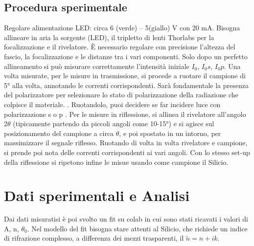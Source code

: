 \documentclass[a4paper,12pt]{article}
\begin{document}
 \subsection{Procedura sperimentale}
 Regolare alimentazione LED:  circa 6 (verde) – 5(giallo) V con 20 mA.
  Bisogna allineare in aria la sorgente (LED), il tripletto di lenti Thorlabs per la focalizzazione e il rivelatore.
   È necessario regolare con precisione l'altezza del fascio, la focalizzazione e le distanze tra i vari componenti.
   Solo dopo un perfetto allineamento si può misurare correttamente l'intensità iniziale $I_0$, $I_0s$, $I_0p$.
   Una volta misurate, per le misure in trasmissione, si procede a ruotare il campione di 5° alla volta, annotando le correnti corrispondenti.
   Sarà fondamentale la presenza del polarizzatore  per selezionare lo stato di polarizzazione della radiazione che colpisce il materiale.
. Ruotandolo, puoi decidere se far incidere luce con polarizzazione s o p .
   Per le misure in riflessione, si allinea il rivelatore all'angolo 2$\theta$ (tipicamente partendo da piccoli angoli come 10-15°) e si agisce sul posizionamento del campione a circa $\theta$, e poi spostato in un intorno, per massimizzare il segnale riflesso.
   Ruotando di volta in volta rivelatore e campione, si prende poi nota delle correnti corrispondenti ai vari angoli.
Con lo stesso set-up della riflessione si ripetono infine le misue usando come campione il Silicio.

\section{Dati sperimentali e Analisi}

Dai dati misuratisi è poi svolto un fit su colab in cui sono stati ricavati i valori di A, n, $\theta_0$.
Nel modello del fit bisogna stare attenti al Silicio, che richiede un indice di rifrazione complesso, a differenza dei mezzi trasparenti, il $\tilde{n} = n + ik$.
\end{document}
